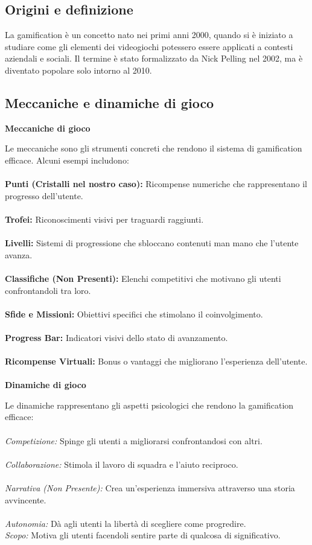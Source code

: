 \documentclass[14pt]{extbook}
\begin{document}
\subsection{Origini e definizione}
La gamification è un concetto nato nei primi anni 2000, quando si è iniziato a studiare come gli elementi dei videogiochi potessero essere applicati a contesti aziendali e sociali. Il termine è stato formalizzato da Nick Pelling nel 2002, ma è diventato popolare solo intorno al 2010.
\subsection{Meccaniche e dinamiche di gioco}
\textbf{Meccaniche di gioco}

Le meccaniche sono gli strumenti concreti che rendono il sistema di gamification efficace. Alcuni esempi includono:\\\\
\textbf{Punti (Cristalli nel nostro caso):} Ricompense numeriche che rappresentano il progresso dell'utente.\\\\
\textbf{Trofei:} Riconoscimenti visivi per traguardi raggiunti.\\\\
\textbf{Livelli:} Sistemi di progressione che sbloccano contenuti man mano che l’utente avanza.\\\\
\textbf{Classifiche (Non Presenti):} Elenchi competitivi che motivano gli utenti confrontandoli tra loro.\\\\
\textbf{Sfide e Missioni:} Obiettivi specifici che stimolano il coinvolgimento.\\\\
\textbf{Progress Bar:} Indicatori visivi dello stato di avanzamento.\\\\
\textbf{Ricompense Virtuali:} Bonus o vantaggi che migliorano l’esperienza dell’utente.\\\\

\textbf{Dinamiche di gioco}

Le dinamiche rappresentano gli aspetti psicologici che rendono la gamification efficace:\\\\
\textit{Competizione:} Spinge gli utenti a migliorarsi confrontandosi con altri.\\\\
\textit{Collaborazione:} Stimola il lavoro di squadra e l’aiuto reciproco.\\\\
\textit{Narrativa (Non Presente):} Crea un’esperienza immersiva attraverso una storia avvincente.\\\\
\textit{Autonomia:} Dà agli utenti la libertà di scegliere come progredire.\\
\textit{Scopo:} Motiva gli utenti facendoli sentire parte di qualcosa di significativo.\\
   
\end{document}
